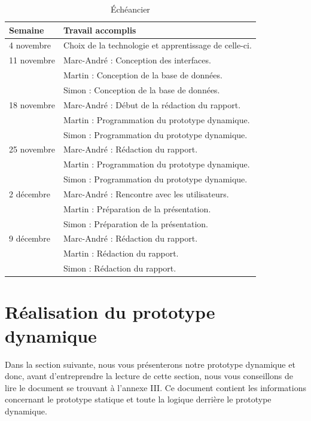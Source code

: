 \documentclass[letterpaper, oneside, 12pt, these, creativecommons]{thETS}
\begin{document}
\begin{table}
	\centering
	\begin{tabular}{|l|l|}
		\hline
		Semaine	& Travail accomplis 								\\ \hline
		4 novembre	& Choix de la technologie et apprentissage de celle-ci.		\\ \hline
		11 novembre	& Marc-André : Conception des interfaces. 				\\
				& Martin : Conception de la base de données.				\\
				& Simon : Conception de la base de données.				\\ \hline
		18 novembre	& Marc-André : Début de la rédaction du rapport. 			\\ 
				& Martin : Programmation du prototype dynamique. 			\\
				& Simon : Programmation du prototype dynamique. 			\\ \hline
		25 novembre	& Marc-André : Rédaction du rapport.		 			\\
				& Martin : Programmation du prototype dynamique. 			\\ 
				& Simon : Programmation du prototype dynamique.		 	\\ \hline
		2 décembre	& Marc-André : Rencontre avec les utilisateurs. 			\\
				& Martin : Préparation de la présentation.				\\
				& Simon : Préparation de la présentation.				\\ \hline
		9 décembre	& Marc-André : Rédaction du rapport.	 				\\ 
				& Martin : Rédaction du rapport.	 					\\ 
				& Simon : Rédaction du rapport.			 			\\ \hline
	\end{tabular}
	\caption{Échéancier}
\end{table}

\chapter{Réalisation du prototype dynamique}

Dans la section suivante, nous vous présenterons notre prototype dynamique et donc, avant d'entreprendre la lecture de cette section, nous vous conseillons de lire le document se trouvant à l'annexe III. Ce document contient les informations concernant le prototype statique et toute la logique derrière le prototype dynamique.
\end{document}
